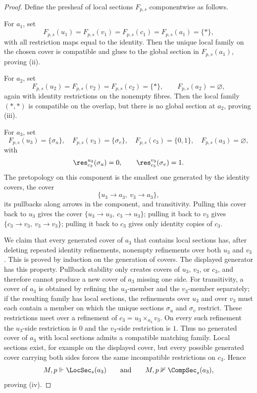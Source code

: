 \begin{proof}
Define the presheaf of local sections $F_{p,s}$ componentwise as follows.

For $a_1$, set
\[
F_{p,s}(u_1)=F_{p,s}(v_1)=F_{p,s}(c_1)=F_{p,s}(a_1)=\{*\},
\]
with all restriction maps equal to the identity. Then the unique local family on the chosen cover is compatible and glues to the global section in $F_{p,s}(a_1)$, proving \textup{(ii)}.

For $a_2$, set
\[
F_{p,s}(u_2)=F_{p,s}(v_2)=F_{p,s}(c_2)=\{*\},
\qquad
F_{p,s}(a_2)=\varnothing,
\]
again with identity restrictions on the nonempty fibres. Then the local family $(*,*)$ is compatible on the overlap, but there is no global section at $a_2$, proving \textup{(iii)}.

For $a_3$, set
\[
F_{p,s}(u_3)=\{\sigma_u\},
\quad
F_{p,s}(v_3)=\{\sigma_v\},
\quad
F_{p,s}(c_3)=\{0,1\},
\quad
F_{p,s}(a_3)=\varnothing,
\]
with
\[
\res_{c_3}^{u_3}(\sigma_u)=0,
\qquad
\res_{c_3}^{v_3}(\sigma_v)=1.
\]
The pretopology on this component is the smallest one generated by the
identity covers, the cover
\[
\{u_3\to a_3,\ v_3\to a_3\},
\]
its pullbacks along arrows in the component, and transitivity. Pulling this
cover back to \(u_3\) gives the cover \(\{u_3\to u_3,\ c_3\to u_3\}\);
pulling it back to \(v_3\) gives \(\{c_3\to v_3,\ v_3\to v_3\}\); pulling it
back to \(c_3\) gives only identity copies of \(c_3\).

We claim that every generated cover of \(a_3\) that contains local sections
has, after deleting repeated identity refinements, nonempty refinements over
both \(u_3\) and \(v_3\). This is proved by induction on the generation of
covers. The displayed generator has this property. Pullback stability only
creates covers of \(u_3\), \(v_3\), or \(c_3\), and therefore cannot produce a
new cover of \(a_3\) missing one side. For transitivity, a cover of \(a_3\)
is obtained by refining the \(u_3\)-member and the \(v_3\)-member separately;
if the resulting family has local sections, the refinements over \(u_3\) and
over \(v_3\) must each contain a member on which the unique sections
\(\sigma_u\) and \(\sigma_v\) restrict. These restrictions meet over a
refinement of \(c_3=u_3\times_{a_3}v_3\). On every such refinement the
\(u_3\)-side restriction is \(0\) and the \(v_3\)-side restriction is \(1\).
Thus no generated cover of \(a_3\) with local sections admits a compatible
matching family. Local sections exist, for example on the displayed cover,
but every possible generated cover carrying both sides forces the same
incompatible restrictions on \(c_3\). Hence
\[
M,p\Vdash \LocSec_s(a_3)
\qquad\text{and}\qquad
M,p\nVdash \CompSec_s(a_3),
\]
proving \textup{(iv)}.


\end{proof}
